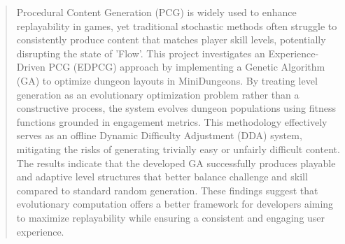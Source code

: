 \begin{abstract}
Procedural Content Generation (PCG) is widely used to enhance replayability in games, yet traditional stochastic methods often 
struggle to consistently produce content that matches player skill levels, potentially disrupting the state of 'Flow'. This project 
investigates an Experience-Driven PCG (EDPCG) approach by implementing a Genetic Algorithm (GA) to optimize dungeon layouts in MiniDungeons. 
By treating level generation as an evolutionary optimization problem rather than a constructive process, the system evolves dungeon 
populations using fitness functions grounded in engagement metrics. This methodology effectively serves as an 
offline Dynamic Difficulty Adjustment (DDA) system, mitigating the risks of generating trivially easy or unfairly difficult content. The 
results indicate that the developed GA successfully produces playable and adaptive level structures that better balance challenge and skill 
compared to standard random generation. These findings suggest that evolutionary computation offers a better framework for developers 
aiming to maximize replayability while ensuring a consistent and engaging user experience.
\end{abstract}